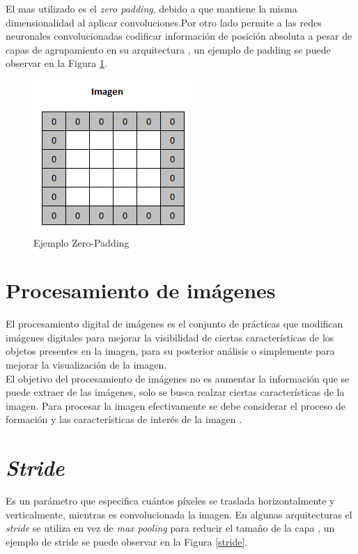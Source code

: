 El mas utilizado es el \textit{zero padding}, debido a que mantiene la misma dimensionalidad al aplicar convoluciones.Por otro lado permite a las redes neuronales convolucionadas codificar información de posición absoluta a pesar de capas de agrupamiento en su arquitectura \cite{islam2021position}, un ejemplo de padding se puede observar en la Figura \ref{padding}.

\begin{figure}[ht]
	\centering
	\includegraphics[scale=0.65]{Figs/padding.png}
	\caption{Ejemplo Zero-Padding}
	\label{padding}
\end{figure}


\newpage
\section{Procesamiento de imágenes} El procesamiento digital de imágenes es el conjunto de prácticas que modifican imágenes digitales para mejorar la visibilidad de ciertas características de los objetos presentes en la imagen, para su posterior análisis o simplemente para mejorar la visualización de la
imagen.\\

El objetivo del procesamiento de imágenes no es aumentar la información que se puede extraer de las imágenes, solo se busca realzar ciertas características de la imagen. Para procesar la imagen efectivamente se debe considerar el proceso de formación y las características de interés de la imagen \cite{ref_13}.

 
 \section{\textit{Stride}}

 
 Es un parámetro que especifica cuántos píxeles se traslada horizontalmente y verticalmente, mientras es convolucionada la imagen. En algunas arquitecturas el \textit{stride} se utiliza en vez de \textit{max pooling} para reducir el tamaño de la capa \cite{murphy2016overview}, un ejemplo de stride se puede observar en la Figura \ref{stride}.
 
